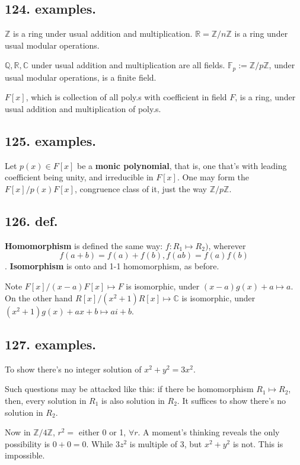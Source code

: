 \documentclass[12pt]{article}
\newcommand\Ev\forall%
\newcommand\Mp\mapsto%
\newcommand{\BF}[1]{ \mathbb{#1} }%
\newcommand{\Ss}[1]{\textsf{\bfseries{#1}}}%
\begin{document}
\subsection*{124. examples.} \(\BF Z\) is a ring under usual addition and multiplication. 
\(\BF R = \BF Z /n \BF Z\) is a ring under usual modular operations. \par
\(\BF Q, \BF R, \BF C\) under usual addition and multiplication are all fields. 
\(\BF F_p := \BF Z / p\BF Z\), under usual modular operations, is a finite field. \par
\(F[x]\), which is collection of all poly.s with coefficient in field \(F\), is a ring, under usual addition and multiplication of poly.s. 

\subsection*{125. examples.} Let \(p(x) \in F[x]\) be a \Ss{monic polynomial}, that is, one that's with leading coefficient being unity, and irreducible in \(F[x]\). 
One may form the \(F[x]/p(x)F[x]\), congruence class of it, just the way \(\BF Z / p \BF Z\). 

\subsection*{126. def.} \Ss{Homomorphism} is defined the same way: \(f: R_1 \Mp R_2)\), wherever \[
 f(a+b) = f(a)+f(b), f(ab) = f(a)f(b)
\]. 
\Ss{Isomorphism} is onto and 1-1 homomorphism, as before. \par
Note \(F[x] / (x-a)F[x] \Mp F\) is isomorphic, under \((x-a)g(x) + a \Mp a\). 
On the other hand \(R[x] / (x^2 +1)R[x] \Mp \BF C\) is isomorphic, under \((x^2+1)g(x) +ax +b \Mp ai +b\). 

\subsection*{127. examples.} To show there's no integer solution of \(x^2 + y^2 = 3x^2\). \par
Such questions may be attacked like this: if there be homomorphism \(R_1 \Mp R_2\), then, every solution in \(R_1\) is also solution in \(R_2\). 
It suffices to show there's no solution in \(R_2\). \par
Now in \(\BF Z / 4\BF Z\), \(r^2=\) either 0 or 1, \(\Ev r\). 
A moment's thinking reveals the only possibility is \(0 + 0 = 0\). 
While \(3z^2\) is multiple of 3, but \(x^2 + y^2\) is not. 
This is impossible. 
\end{document}
